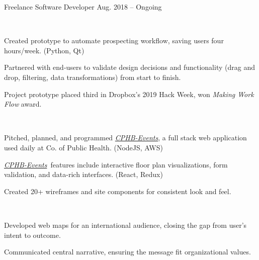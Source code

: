 \newcommand*{\cphbevts}[0]{\href{https://cphb-events.public-health.uiowa.edu/}{\textit{CPHB-Events}}}

\begin{cventries}
  \cventry
    {}
    {Freelance Software Developer}
    {Aug. 2018 -- Ongoing}
    {}
    {%
      \vspace{-1.4\baselineskip}
      \begin{cvitems}
        \item {\\
          \begin{projectitems}
            \item [\textendash] {Created prototype to automate prospecting workflow, saving users four hours/week. (Python, Qt)}
            \item [\textendash] {Partnered with end-users to validate design decisions and functionality (drag and drop, filtering, data transformations) from start to finish.}
            \item [\textendash] {Project prototype placed third in Dropbox's 2019 Hack Week, won \textit{Making Work Flow} award.}
          \end{projectitems}
        }
        \item {\\
          \begin{projectitems}
            \item [\textendash] {Pitched, planned, and programmed \cphbevts, a full stack web application used daily at Co. of Public Health. (NodeJS, AWS)}
            \item [\textendash] {\cphbevts\ features include interactive floor plan visualizations, form validation, and data-rich interfaces. (React, Redux)}
            \item [\textendash] {Created 20+ wireframes and site components for consistent look and feel.}
          \end{projectitems}
        }
        \item {\\
          \begin{projectitems}
            \item [\textendash] {Developed web maps for an international audience, closing the gap from user's intent to outcome.}
            \item [\textendash] {Communicated central narrative, ensuring the message fit organizational values.}
          \end{projectitems}
        }
      \end{cvitems}
  }


\end{cventries}
